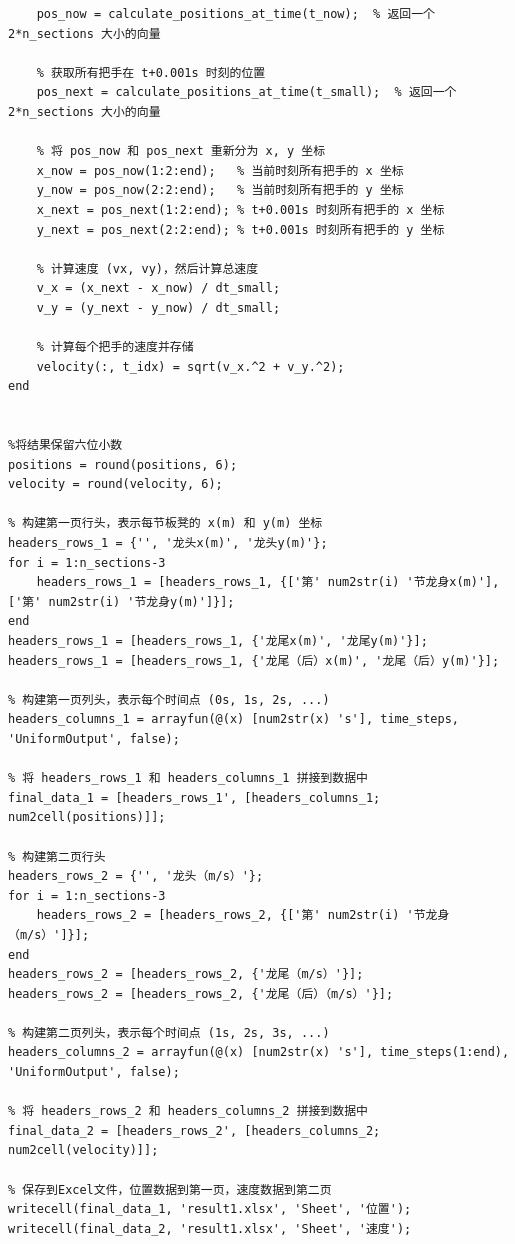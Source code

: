 \documentclass{cumcmthesis1}
\begin{document}
\begin{lstlisting}[caption={计算问题1的代码并将计算结果写入到result1.xlsx中}, label={lst:first_code}]
    % 获取所有把手在 t_now 时刻的位置
    pos_now = calculate_positions_at_time(t_now);  % 返回一个 2*n_sections 大小的向量
    
    % 获取所有把手在 t+0.001s 时刻的位置
    pos_next = calculate_positions_at_time(t_small);  % 返回一个 2*n_sections 大小的向量
    
    % 将 pos_now 和 pos_next 重新分为 x, y 坐标
    x_now = pos_now(1:2:end);   % 当前时刻所有把手的 x 坐标
    y_now = pos_now(2:2:end);   % 当前时刻所有把手的 y 坐标
    x_next = pos_next(1:2:end); % t+0.001s 时刻所有把手的 x 坐标
    y_next = pos_next(2:2:end); % t+0.001s 时刻所有把手的 y 坐标
    
    % 计算速度 (vx, vy)，然后计算总速度
    v_x = (x_next - x_now) / dt_small;
    v_y = (y_next - y_now) / dt_small;
    
    % 计算每个把手的速度并存储
    velocity(:, t_idx) = sqrt(v_x.^2 + v_y.^2);
end


%将结果保留六位小数
positions = round(positions, 6);
velocity = round(velocity, 6);

% 构建第一页行头，表示每节板凳的 x(m) 和 y(m) 坐标
headers_rows_1 = {'', '龙头x(m)', '龙头y(m)'};
for i = 1:n_sections-3
    headers_rows_1 = [headers_rows_1, {['第' num2str(i) '节龙身x(m)'], ['第' num2str(i) '节龙身y(m)']}];
end
headers_rows_1 = [headers_rows_1, {'龙尾x(m)', '龙尾y(m)'}];
headers_rows_1 = [headers_rows_1, {'龙尾（后）x(m)', '龙尾（后）y(m)'}];

% 构建第一页列头，表示每个时间点 (0s, 1s, 2s, ...)
headers_columns_1 = arrayfun(@(x) [num2str(x) 's'], time_steps, 'UniformOutput', false);

% 将 headers_rows_1 和 headers_columns_1 拼接到数据中
final_data_1 = [headers_rows_1', [headers_columns_1; num2cell(positions)]];

% 构建第二页行头
headers_rows_2 = {'', '龙头（m/s）'};
for i = 1:n_sections-3
    headers_rows_2 = [headers_rows_2, {['第' num2str(i) '节龙身（m/s）']}];
end
headers_rows_2 = [headers_rows_2, {'龙尾（m/s）'}];
headers_rows_2 = [headers_rows_2, {'龙尾（后）（m/s）'}];

% 构建第二页列头，表示每个时间点 (1s, 2s, 3s, ...)
headers_columns_2 = arrayfun(@(x) [num2str(x) 's'], time_steps(1:end), 'UniformOutput', false);

% 将 headers_rows_2 和 headers_columns_2 拼接到数据中
final_data_2 = [headers_rows_2', [headers_columns_2; num2cell(velocity)]];

% 保存到Excel文件，位置数据到第一页，速度数据到第二页
writecell(final_data_1, 'result1.xlsx', 'Sheet', '位置');
writecell(final_data_2, 'result1.xlsx', 'Sheet', '速度');

\end{lstlisting}
\end{document}
